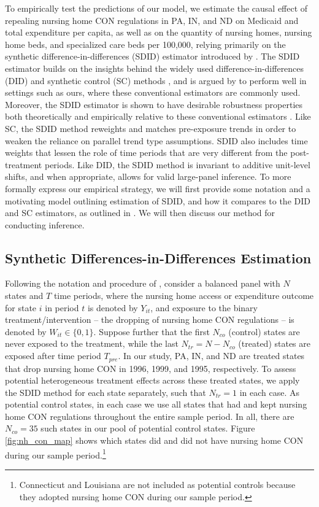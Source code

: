 \documentclass[../Main.tex]{subfiles}
\begin{document}
To empirically test the predictions of our model, we estimate the causal effect of repealing nursing home CON regulations in PA, IN, and ND on Medicaid and total expenditure per capita, as well as on the quantity of nursing homes, nursing home beds, and specialized care beds per 100,000, relying primarily on the synthetic difference-in-differences (SDID) estimator introduced by \citet{arkhangelsky2021synthetic}. The SDID estimator builds on the insights behind the widely used difference-in-differences (DID) and synthetic control (SC) methods \citep{abadie2003economic,abadie2010synthetic,currie2020technology}, and is argued by \citet{arkhangelsky2021synthetic} to perform well in settings such as ours, where these conventional estimators are commonly used. Moreover, the SDID estimator is shown to have desirable robustness properties both theoretically and empirically relative to these conventional estimators \citep{arkhangelsky2021synthetic}. Like SC, the SDID method reweights and matches pre-exposure trends in order to weaken the reliance on parallel trend type assumptions. SDID also includes time weights that lessen the role of time periods that are very different from the post-treatment periods. Like DID, the SDID method is invariant to additive unit-level shifts, and when appropriate, allows for valid large-panel inference. To more formally express our empirical strategy, we will first provide some notation and a motivating model outlining estimation of SDID, and how it compares to the DID and SC estimators, as outlined in \citet{arkhangelsky2021synthetic}. We will then discuss our method for conducting inference.

\subsection{Synthetic Differences-in-Differences Estimation} \label{sdid_estimation}

Following the notation and procedure of \citet{arkhangelsky2021synthetic}, consider a balanced panel with $N$ states and $T$ time periods, where the nursing home access or expenditure outcome for state $i$ in period $t$ is denoted by $Y_{it}$, and exposure to the binary treatment/intervention -- the dropping of nursing home CON regulations -- is denoted by $W_{it} \in \{0,1\}$. Suppose further that the first $N_{co}$ (control) states are never exposed to the treatment, while the last $N_{tr}=N-N_{co}$ (treated) states are exposed after time period $T_{pre}$. In our study, PA, IN, and ND are treated states that drop nursing home CON in 1996, 1999, and 1995, respectively. To assess potential heterogeneous treatment effects across these treated states, we apply the SDID method for each state separately, such that $N_{tr}=1$ in each case. As potential control states, in each case we use all states that had and kept nursing home CON regulations throughout the entire sample period. In all, there are $N_{co}=35$ such states in our pool of potential control states. Figure \ref{fig:nh_con_map} shows which states did and did not have nursing home CON during our sample period.\footnote{Connecticut and Louisiana are not included as potential controls because they adopted nursing home CON during our sample period.}
\end{document}

